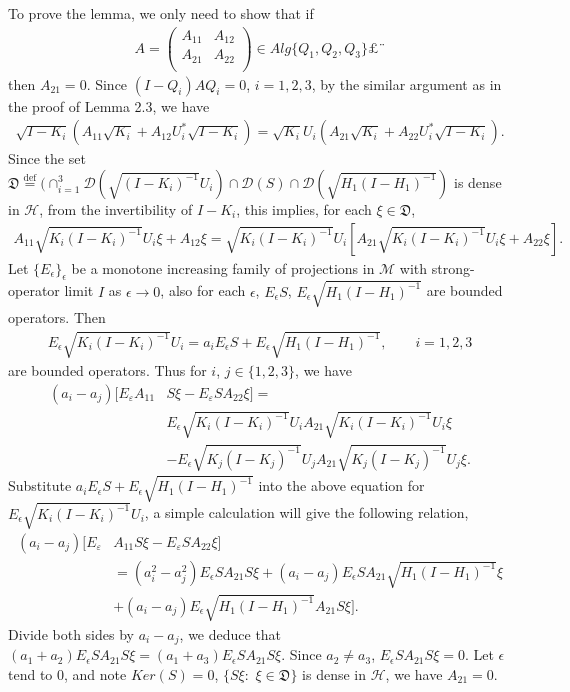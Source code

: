 \documentclass[12pt]{article}
\newcommand{\DDD}{\mathcal D}
\newcommand{\HHH}{\mathcal H} %
\newcommand{\MMM}{\mathcal M}
\begin{document}
{To prove the lemma, we only need to show that if
\begin{align*}
A =\left(
     \begin{array}{cc}
       A_{11} & A_{12} \\
       A_{21} & A_{22} \\
     \end{array}
   \right)\in
 Alg\{Q_{1}, Q_{2}, Q_{3}\} \mbox{£¨}
\end{align*}
then $A_{21} = 0$. Since $(I-Q_{i})AQ_{i} = 0$,
$i=1,2,3$, by the similar argument as in the proof of  Lemma 2.3, we have
\begin{align*}
\sqrt{I-K_i}( A_{11}\sqrt{K_i} +A_{12}U_i^*\sqrt{I-K_i})=\sqrt{K_i}U_i(A_{21}\sqrt{K_i}+A_{22}U_i^*\sqrt{I-K_i}).
\end{align*}
Since the set
$\mathfrak{D} \overset{\text{def}}{=} (\cap_{i=1}^{3}\DDD(\sqrt{(I-K_i)^{-1}}U_i)\cap\DDD(S)\cap\DDD(\sqrt{H_{1}(I-H_{1})^{-1}})$ is dense in $\HHH$, from the
invertibility of $I-K_i$, this implies, for each $\xi \in \mathfrak{D}$,
\begin{align*}
A_{11}\sqrt{K_{i}(I-K_{i})^{-1}}U_{i}\xi + A_{12}\xi = 
\sqrt{K_{i}(I-K_{i})^{-1}}U_{i}[A_{21}\sqrt{K_{i}(I-K_{i})^{-1}}U_{i}\xi
+ A_{22}\xi].
\end{align*}
Let $\{ E_\epsilon \}_{\epsilon}$ be a monotone increasing family of projections in $\MMM$ with strong-operator limit $I$ as $\epsilon \rightarrow 0$, also for each $\epsilon$, $E_\epsilon S$, $E_\epsilon
\sqrt{H_{1}(I-H_{1})^{-1}}$ are bounded operators. Then
\begin{align*}
E_\epsilon \sqrt{K_{i}(I-K_{i})^{-1}}U_i = a_{i}E_\epsilon S +
E_\epsilon \sqrt{H_{1}(I-H_{1})^{-1}}, \qquad i=1,2,3
\end{align*}
are bounded operators. Thus for $i$, $j \in \{1, 2, 3\}$, we have
\begin{align*}
(a_{i} -a_{j})[E_{\varepsilon}A_{11} &S\xi -
E_{\varepsilon}SA_{22}\xi]= \\
&E_\epsilon\sqrt{K_{i}(I  -K_{i})^{-1}}
U_{i}A_{21} \sqrt{K_{i}(I-K_{i})^{-1}}U_{i}\xi \\
&-E_{\epsilon}\sqrt{K_{j}(I-K_{j})^{-1}}
U_{j}A_{21}\sqrt{K_{j}(I-K_{j})^{-1}}U_{j}\xi.
\end{align*}
Substitute $a_{i}E_\epsilon S + E_\epsilon \sqrt{H_{1}(I-H_{1})^{-1}}$ into the above equation for $E_\epsilon \sqrt{K_{i}(I-K_{i})^{-1}}U_i$, a simple calculation will give the following relation,
\begin{align*} 
(a_{i} -a_{j})[E_{\varepsilon} &A_{11}S\xi -
E_{\varepsilon}SA_{22}\xi]\\
&= (a_i^2-a_j^2)E_{\epsilon}SA_{21}S\xi+(a_i-a_j)E_{\epsilon}SA_{21}\sqrt{H_{1}(I-H_{1})^{-1}}\xi\\
&+ (a_i-a_j)E_{\epsilon}\sqrt{H_{1}(I-H_{1})^{-1}}A_{21}S\xi].
\end{align*}
Divide both sides by $a_i - a_j$, we deduce that $(a_1+a_2)E_{\epsilon}SA_{21}S\xi = (a_1+a_3)E_{\epsilon}SA_{21}S\xi$. Since $a_2\neq a_3$, $E_{\epsilon}SA_{21}S\xi=0$. Let
$\epsilon$ tend to $0$, and note $Ker(S) = 0$,
$\{S\xi:\,\,\xi\in \mathfrak{D}\}$ is dense in $\HHH$, we have $A_{21} = 0$.

}
\end{document}
